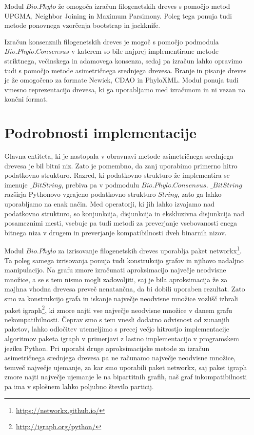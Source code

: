 \documentclass[a4paper, 12pt]{book}
\begin{document}
Modul $Bio.Phylo$ že omogoča izračun filogenetskih dreves s pomočjo metod UPGMA, Neighbor Joining in Maximum Parsimony. Poleg tega ponuja tudi metode ponovnega vzorčenja bootstrap in jackknife.  

Izračun konsenznih filogenetskih dreves je mogoč s pomočjo podmodula $Bio.Phylo.Consensus$ v katerem so bile najprej implementirane metode striktnega, večinskega in adamovega konsenza, sedaj pa izračun lahko opravimo tudi s pomočjo metode asimetričnega srednjega drevesa. Branje in pisanje dreves je že omogočeno za formate Newick, CDAO in PhyloXML. Modul ponuja tudi vmesno reprezentacijo drevesa, ki ga uporabljamo med izračunom in ni vezan na končni format.

\section{Podrobnosti implementacije}
Glavna entiteta, ki je nastopala v obravnavi metode asimetričnega srednjega drevesa je bil bitni niz. Zato je pomembno, da zanj uporabimo primerno hitro podatkovno strukturo. Razred, ki podatkovno strukturo že implementira se imenuje $\_BitString$, prebiva pa v podmodulu $Bio.Phylo.Consensus$. $\_BitString$ razširja Pythonovo vgrajeno podatkovno strukturo $String$, zato ga lahko uporabljamo na enak način. Med operatorji, ki jih lahko izvajamo nad podatkovno strukturo, so konjunkcija, disjunkcija in ekskluzivna disjunkcija nad posameznimi mesti, vsebuje pa tudi metodi za preverjanje vsebovanosti enega bitnega niza v drugem in preverjanje kompatibilnosti dveh binarnih nizov. 

Modul $Bio.Phylo$ za izrisovanje filogenetskih dreves uporablja paket networkx\footnote{\url{https://networkx.github.io/}}. Ta poleg samega izrisovanja ponuja tudi konstrukcijo grafov in njihovo nadaljno manipulacijo. Na grafu zmore izračunati aproksimacijo največje neodvisne množice, a se s tem nismo mogli zadovoljiti, saj je bila aproksimacija že za majhna vhodna drevesa preveč nenatančna, da bi dobili uporaben rezultat. Zato smo za konstrukcijo grafa in iskanje največje neodvisne množice vozlišč izbrali paket igraph\footnote{\url{http://igraph.org/python/}}, ki zmore najti vse največje neodvisne množice v danem grafu nekompatibilnosti. Čeprav smo s tem vnesli dodatno odvisnost od zunanjih paketov, lahko odločitev utemeljimo s precej večjo hitrostjo implementacije algoritmov paketa igraph v primerjavi z lastno implementacijo v programskem jeziku Python. Pri uporabi druge aproksimacijske metode za izračun asimetričnega srednjega drevesa pa ne računamo največje neodvisne množice, temveč največje ujemanje, za kar smo uporabili paket networkx, saj paket igraph zmore najti največje ujemanje le na bipartitnih grafih, naš graf inkompatibilnosti pa ima v splošnem lahko poljubno število particij.
\end{document}
